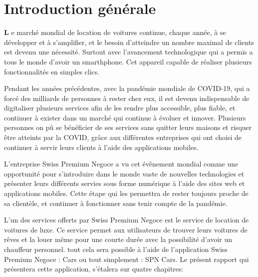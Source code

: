 \thispagestyle{plain}
\section{Introduction générale}
\vspace{1.5cm}
\setlength{\parindent}{40pt}
\justifying
\begin{small}
    \lettrine[findent=2pt]{\textbf{L}}{ }e marché mondial de location de voitures continue, chaque année, à se développer et à s'amplifier, et le besoin d'atteindre un nombre maximal de clients est devenu une nécessité. Surtout avec l'avancement technologique qui a permis a tous le monde d'avoir un smarthphone. Cet appareil capable de réaliser plusieurs fonctionnalités en simples clics.

    \noindent Pendant les années précédentes, avec la pandémie mondiale de COVID-19, qui a forcé des milliards de personnes à rester chez eux, il est devenu indispensable de digitaliser plusieurs services afin de les rendre plus accessible, plus fiable, et continuer à exister dans un marché qui continue à évoluer et innover. Plusieurs personnes on pû se bénéficier de ses services sans quitter leurs maisons et risquer être atteints par la COVID, grâce aux différentes entreprises qui ont choisi de continuer à servir leurs clients à l'aide des applications mobiles.

    \noindent L'entreprise Swiss Premium Negoce a vu cet évênement mondial comme une opportunité pour s'introduire dans le monde vaste de nouvelles technologies et présenter leurs différents servies sous forme numérique à l'aide des sites web et applications mobiles. Cette étape qui les permettra de rester toujours proche de sa clientèle, et continuer à fonctionner sans tenir compte de la pandémie.

    \noindent L'un des services offerts par Swiss Premium Negoce est le service de location de voitures de luxe. Ce service permet aux utilisateurs de trouver leurs voitures de rêves et la louer même pour une courte durée avec la possibilité d'avoir un chauffeur personnel. tout cela sera possible à l'aide de l'application Swiss Premium Negoce : Cars ou tout simplement : SPN Cars. Le présent rapport qui présentera cette application, s'étalera sur quatre chapitres:


\end{small}
